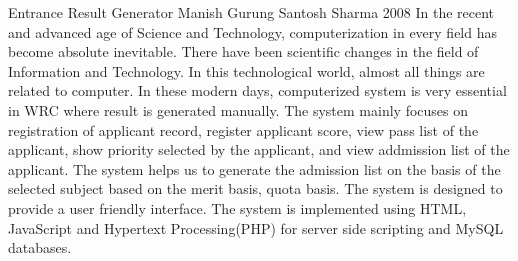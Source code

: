  \begin{conf-abstract}[]
{Entrance Result Generator}
{
Manish Gurung
Santosh Sharma
}
{2008}
	In the recent and advanced age of Science and Technology, computerization in every field has become 
absolute inevitable. There have been scientific changes in the field of Information and Technology. In this 
technological world, almost all things are related to computer. In these modern days, computerized system is 
very essential in WRC where result is generated manually. The system mainly focuses on registration of 
applicant record, register applicant score, view pass list of the applicant, show priority selected by the 
applicant, and view addmission list of the applicant. The system helps us to generate the admission list on the
basis of the selected subject based on the merit basis, quota basis. The system is designed to provide a user 
friendly interface. The system is implemented using HTML, JavaScript and Hypertext Processing(PHP) for server 
side scripting and MySQL databases.
  \end{conf-abstract}